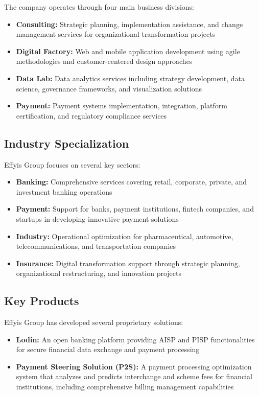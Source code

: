 The company operates through four main business divisions:

\begin{itemize}
    \item \textbf{Consulting:} Strategic planning, implementation assistance, and change management services for organizational transformation projects
    \item \textbf{Digital Factory:} Web and mobile application development using agile methodologies and customer-centered design approaches
    \item \textbf{Data Lab:} Data analytics services including strategy development, data science, governance frameworks, and visualization solutions
    \item \textbf{Payment:} Payment systems implementation, integration, platform certification, and regulatory compliance services
\end{itemize}

\subsection{Industry Specialization}

Effyis Group focuses on several key sectors:

\begin{itemize}
    \item \textbf{Banking:} Comprehensive services covering retail, corporate, private, and investment banking operations
    \item \textbf{Payment:} Support for banks, payment institutions, fintech companies, and startups in developing innovative payment solutions
    \item \textbf{Industry:} Operational optimization for pharmaceutical, automotive, telecommunications, and transportation companies
    \item \textbf{Insurance:} Digital transformation support through strategic planning, organizational restructuring, and innovation projects
\end{itemize}

\subsection{Key Products}

Effyis Group has developed several proprietary solutions:

\begin{itemize}
    \item \textbf{Lodin:} An open banking platform providing AISP and PISP functionalities for secure financial data exchange and payment processing
    \item \textbf{Payment Steering Solution (P2S):} A payment processing optimization system that analyzes and predicts interchange and scheme fees for financial institutions, including comprehensive billing management capabilities
\end{itemize}

